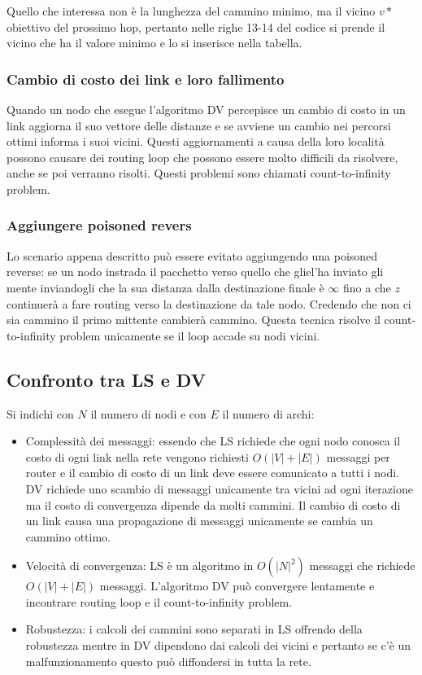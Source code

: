 Quello che interessa non \`e la lunghezza del cammino minimo, ma il vicino $v*$ obiettivo del prossimo hop, pertanto nelle righe 13-14 del codice si
prende il vicino che ha il valore minimo e lo si inserisce nella tabella. 
\subsubsection{Cambio di costo dei link e loro fallimento}
Quando un nodo che esegue l'algoritmo DV percepisce un cambio di costo in un link aggiorna il suo vettore delle distanze e se avviene un cambio nei percorsi
ottimi informa i suoi vicini. Questi aggiornamenti a causa della loro localit\`a possono causare dei routing loop che possono essere molto difficili da
risolvere, anche se poi verranno risolti. Questi problemi sono chiamati count-to-infinity problem. 
\subsubsection{Aggiungere poisoned revers}
Lo scenario appena descritto pu\`o essere evitato aggiungendo una poisoned reverse: se un nodo instrada il pacchetto verso quello che gliel'ha inviato gli 
mente inviandogli che la sua distanza dalla destinazione finale \`e $\infty$ fino a che $z$ continuer\`a a fare routing verso la destinazione da tale nodo.
Credendo che non ci sia cammino il primo mittente cambier\`a cammino. Questa tecnica risolve il count-to-infinity problem unicamente se il loop accade su 
nodi vicini. 
\subsection{Confronto tra LS e DV}
Si indichi con $N$ il numero di nodi e con $E$ il numero di archi:
\begin{itemize}
\item Complessit\`a dei messaggi: essendo che LS richiede che ogni nodo conosca il costo di ogni link nella rete vengono richiesti $O(|V|+|E|)$ messaggi per router e 
il cambio di costo di un link deve essere comunicato a tutti i nodi. DV richiede uno scambio di messaggi unicamente tra vicini ad ogni iterazione ma il costo
di convergenza dipende da molti cammini. Il cambio di costo di un link causa una propagazione di messaggi unicamente se cambia un cammino ottimo.
\item Velocit\`a di convergenza: LS \`e un algoritmo in $O(|N|^2)$ messaggi che richiede $O(|V|+|E|)$ messaggi. L'algoritmo DV pu\`o convergere lentamente
e incontrare routing loop e il count-to-infinity problem.
\item Robustezza: i calcoli dei cammini sono separati in LS offrendo della robustezza mentre in DV dipendono dai calcoli dei vicini e pertanto se c'\`e un
malfunzionamento questo pu\`o diffondersi in tutta la rete.
\end{itemize}

